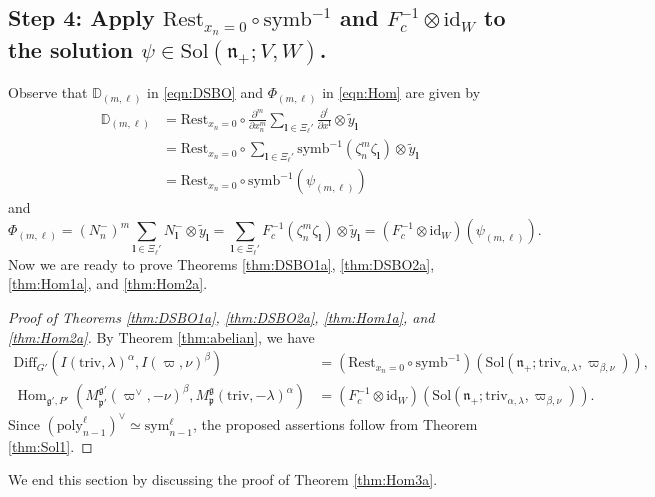 \documentclass[reqno,11pt]{amsart}
\theoremstyle{remark}
\theoremstyle{definition}
\numberwithin{equation}{section}
\newcommand{\gb}{\beta}
\newcommand{\ga}{\alpha}
\newcommand{\fg}{{\mathfrak g}}
\newcommand{\fn}{{\mathfrak n}}
\newcommand{\fp}{{\mathfrak p}}
\newcommand{\Hom}{\operatorname{Hom}}
\newcommand{\Sol}{\mathrm{Sol}}
\newcommand{\poly}{\mathrm{poly}}
\newcommand{\Diff}{\mathrm{Diff}}
\newcommand{\triv}{\mathrm{triv}}
\newcommand{\sym}{\mathrm{sym}}
\newcommand{\id}{\mathrm{id}}
\newcommand{\symb}{\mathrm{symb}}
\newcommand{\Mp}{M^{\fg}_{\fp}}
\newcommand{\Mpp}{M^{\fg'}_{\fp'}}
\newcommand{\wy}{\widetilde{y}}
\newcommand{\Rest}{\mathrm{Rest}}
\newcommand{\bD}{\mathbb{D}}
\begin{document}
\subsection{Step 4: 
Apply $\Rest_{x_n=0}\circ \symb^{-1}$ 
and
$F_c^{-1} \otimes \id_W$ 
to the solution 
$\psi \in \mathrm{Sol}(\mathfrak n_+;V,W)$.
}
\label{sec:Step4}

Observe that 
$\bD_{(m,\ell)}$ in \eqref{eqn:DSBO} and $\Phi_{(m,\ell)}$ 
in \eqref{eqn:Hom} are 
given by
\begin{align*}
\bD_{(m,\ell)}
&=
\Rest_{x_n=0} \circ
\frac{\partial^m}{\partial x_n^m}\sum_{\mathbf{l} \in \Xi_\ell'} \frac{\partial^\ell}{\partial x^{\mathbf{l}}}
\otimes 
\wy_{\mathbf{l}}\\
&=
\Rest_{x_n=0} \circ
\sum_{\mathbf{l} \in \Xi_\ell'} 
\symb^{-1}(\zeta_n^m\zeta_{\mathbf{l}})
\otimes 
\wy_{\mathbf{l}}\\
&= \Rest_{x_n=0}\circ \symb^{-1}(\psi_{(m,\ell)})
\end{align*}
and
\begin{equation*}
\Phi_{(m,\ell)}
= 
(N_n^-)^m
\sum_{\mathbf{l} \in \Xi_\ell'} 
N_{\mathbf{l}}^-
\otimes 
\widetilde{y}_{\mathbf{l}}
=\sum_{\mathbf{l} \in \Xi_\ell'} 
F_c^{-1}(\zeta_n^m\zeta_\mathbf{l})
\otimes 
\widetilde{y}_{\mathbf{l}}
=(F_c^{-1} \otimes \id_{W})(\psi_{(m,\ell)}).
\end{equation*}
\noindent
Now we are ready to prove Theorems \ref{thm:DSBO1a}, \ref{thm:DSBO2a}, \ref{thm:Hom1a},
and \ref{thm:Hom2a}.

\begin{proof}[Proof of 
Theorems \ref{thm:DSBO1a}, \ref{thm:DSBO2a}, \ref{thm:Hom1a},
and \ref{thm:Hom2a}]
By Theorem \ref{thm:abelian}, we have
\begin{align*}
\Diff_{G'}(I(\triv, \lambda)^\ga, I(\varpi,  \nu)^\beta)
&=
(\Rest_{x_n=0}\circ 
\symb^{-1})(\Sol(\fn_+; \triv_{\alpha, \lambda}, \varpi_{\beta, \nu})),\\
\Hom_{\fg', P'}(\Mpp(\varpi^\vee,-\nu)^\gb, \Mp(\triv, -\lambda)^\ga)
&=
(F_c^{-1}\otimes \id_{W})(\Sol(\fn_+; \triv_{\alpha, \lambda}, \varpi_{\beta, \nu})).
\end{align*}
Since $(\poly_{n-1}^\ell)^\vee \simeq \sym_{n-1}^\ell$, 
the proposed assertions follow from Theorem \ref{thm:Sol1}.
\end{proof}

We end this section by discussing the proof of Theorem \ref{thm:Hom3a}.
\end{document}
